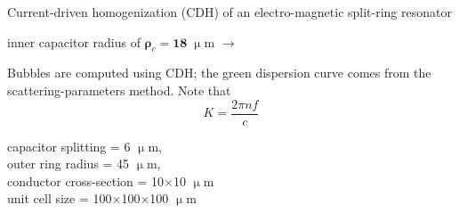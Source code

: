 \documentclass[t]{beamer} \usepackage[english]{babel} \usepackage[utf8]{inputenc} \usetheme{Frankfurt} %
\begin{document}
\begin{frame}[plain]{}%
\begin{columns}[T] %
	\begin{column}{.55\textwidth}
	\vspace{3mm}
	\noindent Current-driven homogenization (CDH) of an electro-magnetic split-ring resonator 
	\begin{exampleblock}\hfill inner capacitor radius of $\pmb\rho_c=\pmb{18}\;\upmu$m $\rightarrow$\end{exampleblock}
	\vspace{3mm}

	\noindent Bubbles are computed using CDH; the green dispersion curve comes from the scattering-parameters method. Note that $$K = \frac{2\pi n f}{c}$$
	\vspace{12mm}

	\small{capacitor splitting = 6 $\upmu$m,\\ outer ring radius = 45 $\upmu$m,\\ conductor cross-section = 10$\times$10 $\upmu$m\\ unit cell size = 100$\times$100$\times$100 $\upmu$m}
	\vspace{5mm}


\end{column}
\end{columns}
\end{frame}
\end{document}
